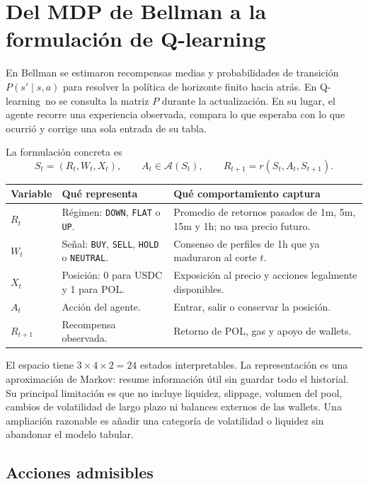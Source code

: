 \documentclass[12pt,letterpaper]{article}
\newcommand{\code}[1]{\texttt{#1}}
\newcommand{\q}{Q-learning}
\begin{document}
\section{Del MDP de Bellman a la formulación de Q-learning}

En Bellman se estimaron recompensas medias y probabilidades de transición
$P(s'\mid s,a)$ para resolver la política de horizonte finito hacia atrás. En
\q\ no se consulta la matriz $P$ durante la actualización. En su lugar, el
agente recorre una experiencia observada, compara lo que esperaba con lo que
ocurrió y corrige una sola entrada de su tabla.

La formulación concreta es
\[
S_t=(R_t,W_t,X_t),\qquad A_t\in\mathcal A(S_t),\qquad
R_{t+1}=r(S_t,A_t,S_{t+1}).
\]

\begin{center}
\begin{tabularx}{0.95\linewidth}{p{2.6cm}Y Y}
\toprule
\textbf{Variable} & \textbf{Qué representa} & \textbf{Qué comportamiento captura}\\
\midrule
$R_t$ & Régimen: \code{DOWN}, \code{FLAT} o \code{UP}. & Promedio de retornos pasados de 1m, 5m, 15m y 1h; no usa precio futuro.\\
$W_t$ & Señal: \code{BUY}, \code{SELL}, \code{HOLD} o \code{NEUTRAL}. & Consenso de perfiles de 1h que ya maduraron al corte $t$.\\
$X_t$ & Posición: 0 para USDC y 1 para POL. & Exposición al precio y acciones legalmente disponibles.\\
$A_t$ & Acción del agente. & Entrar, salir o conservar la posición.\\
$R_{t+1}$ & Recompensa observada. & Retorno de POL, gas y apoyo de wallets.\\
\bottomrule
\end{tabularx}
\end{center}

El espacio tiene $3\times4\times2=24$ estados interpretables. La
representación es una aproximación de Markov: resume información útil sin
guardar todo el historial. Su principal limitación es que no incluye liquidez,
slippage, volumen del pool, cambios de volatilidad de largo plazo ni balances
externos de las wallets. Una ampliación razonable es añadir una categoría de
volatilidad o liquidez sin abandonar el modelo tabular.

\subsection{Acciones admisibles}
\end{document}
